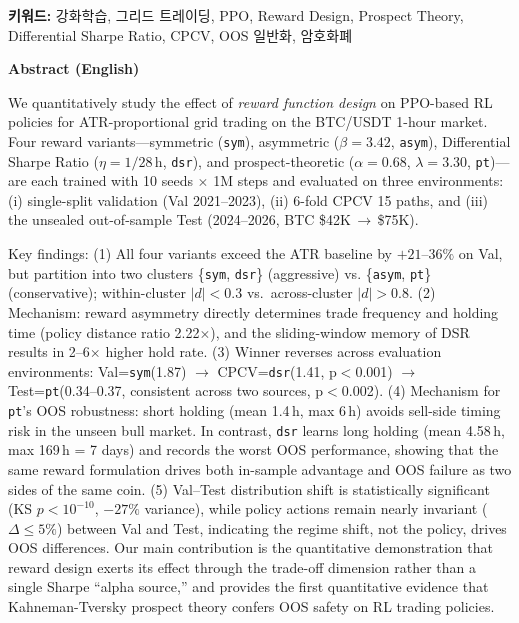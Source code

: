 \documentclass[11pt, a4paper]{article}
\begin{document}
\vspace{1em}
\noindent\textbf{키워드:} 강화학습, 그리드 트레이딩, PPO, Reward Design, Prospect Theory,
Differential Sharpe Ratio, CPCV, OOS 일반화, 암호화폐

\vspace{1em}
\begin{center}\textbf{Abstract (English)}\end{center}
\small
We quantitatively study the effect of \emph{reward function design} on PPO-based RL
policies for ATR-proportional grid trading on the BTC/USDT 1-hour market. Four reward
variants---symmetric (\texttt{sym}), asymmetric ($\beta=3.42$, \texttt{asym}),
Differential Sharpe Ratio ($\eta=1/28\,\mathrm{h}$, \texttt{dsr}), and
prospect-theoretic ($\alpha=0.68$, $\lambda=3.30$, \texttt{pt})---are each trained
with 10 seeds $\times$ 1M steps and evaluated on three environments:
(i) single-split validation (Val 2021--2023), (ii) 6-fold CPCV 15 paths, and
(iii) the unsealed out-of-sample Test (2024--2026, BTC \$42K\,$\to$\,\$75K).

Key findings:
(1) All four variants exceed the ATR baseline by $+21$--$36\%$ on Val, but partition
into two clusters \{\texttt{sym}, \texttt{dsr}\} (aggressive) vs.
\{\texttt{asym}, \texttt{pt}\} (conservative); within-cluster $|d|<0.3$ vs.\
across-cluster $|d|>0.8$.
(2) Mechanism: reward asymmetry directly determines trade frequency and holding time
(policy distance ratio 2.22$\times$), and the sliding-window memory of DSR results in
2--6$\times$ higher hold rate.
(3) Winner reverses across evaluation environments: Val=\texttt{sym}(1.87)
$\to$ CPCV=\texttt{dsr}(1.41, p$<$0.001) $\to$ Test=\texttt{pt}(0.34--0.37,
consistent across two sources, p$<$0.002).
(4) Mechanism for \texttt{pt}'s OOS robustness: short holding (mean 1.4\,h, max 6\,h)
avoids sell-side timing risk in the unseen bull market. In contrast, \texttt{dsr}
learns long holding (mean 4.58\,h, max 169\,h = 7 days) and records the worst OOS
performance, showing that the same reward formulation drives both in-sample advantage
and OOS failure as two sides of the same coin.
(5) Val--Test distribution shift is statistically significant
(KS $p<10^{-10}$, $-27\%$ variance), while policy actions remain nearly invariant
($\Delta \leq 5\%$) between Val and Test, indicating the regime shift, not the policy,
drives OOS differences. Our main contribution is the quantitative demonstration that
reward design exerts its effect through the trade-off dimension rather than a single
Sharpe ``alpha source,'' and provides the first quantitative evidence that
Kahneman-Tversky prospect theory confers OOS safety on RL trading policies.
\normalsize
\end{document}
